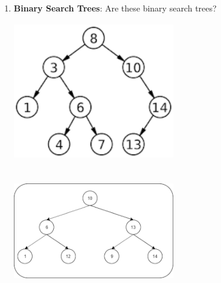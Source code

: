 \documentclass{article}
\begin{document}
\begin{enumerate}[label=(\alph*)]
    \item \textbf{Binary Search Trees}: Are these binary search trees?
    
    \includegraphics[width=7cm,height=6cm]{figures/bst.png}
    \includegraphics[width=7cm,height=6cm]{figures/notbst.png}
    

\end{enumerate}
\end{document}
